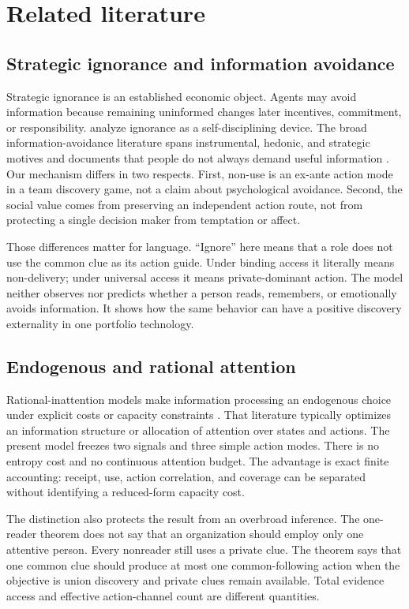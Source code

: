 \documentclass[11pt]{article}
\begin{document}
\section{Related literature}

\subsection{Strategic ignorance and information avoidance}

Strategic ignorance is an established economic object. Agents may avoid
information because remaining uninformed changes later incentives, commitment,
or responsibility. \citet{CarrilloMariotti2000} analyze ignorance as a
self-disciplining device. The broad information-avoidance literature spans
instrumental, hedonic, and strategic motives and documents that people do not
always demand useful information \citep{GolmanEtAl2017}. Our mechanism differs
in two respects. First, non-use is an ex-ante action mode in a team discovery
game, not a claim about psychological avoidance. Second, the social value comes
from preserving an independent action route, not from protecting a single
decision maker from temptation or affect.

Those differences matter for language. ``Ignore'' here means that a role does
not use the common clue as its action guide. Under binding access it literally
means non-delivery; under universal access it means private-dominant action.
The model neither observes nor predicts whether a person reads, remembers, or
emotionally avoids information. It shows how the same behavior can have a
positive discovery externality in one portfolio technology.

\subsection{Endogenous and rational attention}

Rational-inattention models make information processing an endogenous choice
under explicit costs or capacity constraints \citep{Sims2003}. That literature
typically optimizes an information structure or allocation of attention over
states and actions. The present model freezes two signals and three simple
action modes. There is no entropy cost and no continuous attention budget. The
advantage is exact finite accounting: receipt, use, action correlation, and
coverage can be separated without identifying a reduced-form capacity cost.

The distinction also protects the result from an overbroad inference. The
one-reader theorem does not say that an organization should employ only one
attentive person. Every nonreader still uses a private clue. The theorem says
that one common clue should produce at most one common-following action when the
objective is union discovery and private clues remain available. Total evidence
access and effective action-channel count are different quantities.
\end{document}
